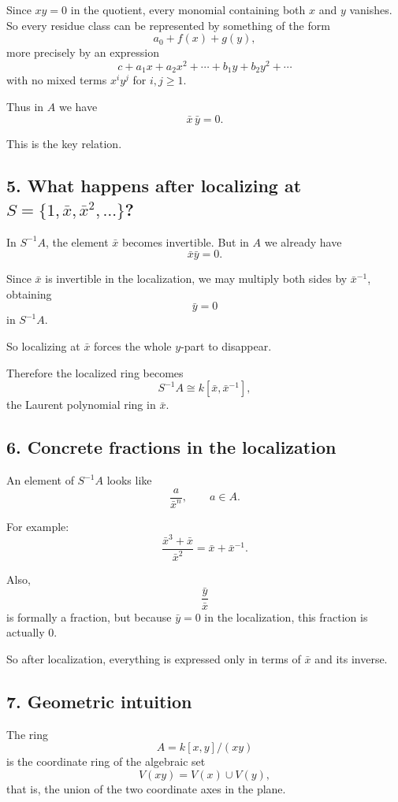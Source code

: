 \documentclass[12pt,a4paper]{article}
\theoremstyle{notespace}
\begin{document}
Since \(xy=0\) in the quotient, every monomial containing both \(x\) and \(y\) vanishes. So every residue class can be represented by something of the form
\[
a_0 + f(x) + g(y),
\]
more precisely by an expression
\[
c + a_1x+a_2x^2+\cdots + b_1y+b_2y^2+\cdots
\]
with no mixed terms \(x^iy^j\) for \(i,j\ge 1\).

Thus in \(A\) we have
\[
\bar x\,\bar y=0.
\]

This is the key relation.

\subsection*{5. What happens after localizing at \(S=\{1,\bar x,\bar x^2,\dots\}\)?}

In \(S^{-1}A\), the element \(\bar x\) becomes invertible. But in \(A\) we already have
\[
\bar x\bar y=0.
\]

Since \(\bar x\) is invertible in the localization, we may multiply both sides by \(\bar x^{-1}\), obtaining
\[
\bar y=0
\]
in \(S^{-1}A\).

So localizing at \(\bar x\) forces the whole \(y\)-part to disappear.

Therefore the localized ring becomes
\[
S^{-1}A \cong k[\bar x,\bar x^{-1}],
\]
the Laurent polynomial ring in \(\bar x\).

\subsection*{6. Concrete fractions in the localization}

An element of \(S^{-1}A\) looks like
\[
\frac{a}{\bar x^n}, \qquad a\in A.
\]

For example:
\[
\frac{\bar x^3+\bar x}{\bar x^2}
= \bar x + \bar x^{-1}.
\]

Also,
\[
\frac{\bar y}{\bar x}
\]
is formally a fraction, but because \(\bar y=0\) in the localization, this fraction is actually \(0\).

So after localization, everything is expressed only in terms of \(\bar x\) and its inverse.

\subsection*{7. Geometric intuition}

The ring
\[
A=k[x,y]/(xy)
\]
is the coordinate ring of the algebraic set
\[
V(xy)=V(x)\cup V(y),
\]
that is, the union of the two coordinate axes in the plane.
\end{document}

